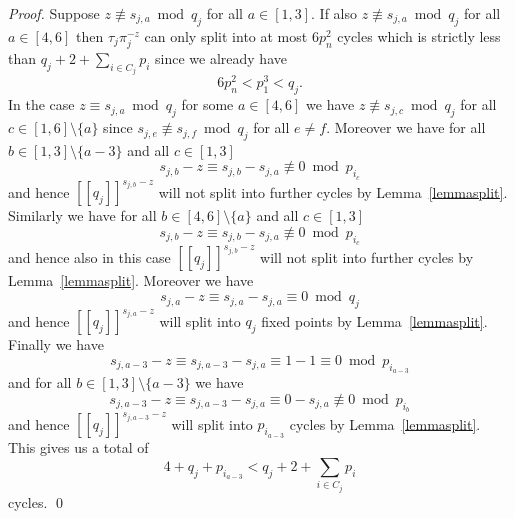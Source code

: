 \documentclass{article}
\newcommand{\llbracket}{[\![}
\newcommand{\rrbracket}{]\!]}
\begin{document}
\begin{proof}
Suppose $z \not \equiv s_{j,a} \bmod q_j$ for all $a \in [1,3]$. If also $z \not \equiv s_{j,a} \bmod q_j$ for all $a \in [4,6]$ then $\tau_j\pi_j^{-z}$ can only split into at most $6p_n^2$ cycles which is strictly less than $q_j + 2 + \sum_{i \in C_j} p_i$ since we already have
\begin{displaymath}
6p_n^2 < p_1^3 < q_j.
\end{displaymath}
In the case $z \equiv s_{j,a} \bmod q_j$ for some $a \in [4,6]$ we have $z \not \equiv s_{j,c} \bmod q_j$ for all $c \in [1,6] \setminus \{a\}$ since $s_{j,e} \not \equiv s_{j,f} \bmod q_j$ for all $e \neq f$. Moreover we have for all $b \in [1,3] \setminus \{a-3\}$ and all $c \in [1,3]$
\begin{displaymath}
s_{j,b} - z \equiv s_{j,b} - s_{j,a} \not \equiv 0 \bmod p_{i_c}
\end{displaymath}
and hence $\llbracket q_j \rrbracket^{s_{j,b}-z}$ will not split into further cycles by Lemma~\ref{lemmasplit}. Similarly we have for all $b \in [4,6] \setminus \{a\}$ and all $c \in [1,3]$
\begin{displaymath}
s_{j,b} - z \equiv s_{j,b} - s_{j,a} \not \equiv 0 \bmod p_{i_c}
\end{displaymath}
and hence also in this case $\llbracket q_j \rrbracket^{s_{j,b}-z}$ will not split into further cycles by Lemma~\ref{lemmasplit}. Moreover we have
\begin{displaymath}
s_{j,a} - z \equiv s_{j,a} - s_{j,a} \equiv 0 \bmod q_j
\end{displaymath}
and hence $\llbracket q_j \rrbracket^{s_{j,a}-z}$ will split into $q_j$ fixed points by Lemma~\ref{lemmasplit}. Finally we have
\begin{displaymath}
s_{j,a-3} - z \equiv s_{j,a-3} - s_{j,a} \equiv 1 - 1 \equiv 0 \bmod p_{i_{a-3}}
\end{displaymath}
and for all $b \in [1,3] \setminus \{a-3\}$ we have
\begin{displaymath}
s_{j,a-3} - z \equiv s_{j,a-3} - s_{j,a} \equiv 0 - s_{j,a} \not \equiv 0 \bmod p_{i_b}
\end{displaymath}
and hence $\llbracket q_j \rrbracket^{s_{j,a-3}-z}$ will split into $p_{i_{a-3}}$ cycles by Lemma~\ref{lemmasplit}. This gives us a total of
\begin{displaymath}
4 + q_j + p_{i_{a-3}} < q_j + 2 + \sum_{i \in C_j} p_i
\end{displaymath}
cycles.
\qed


\end{proof}
\end{document}
